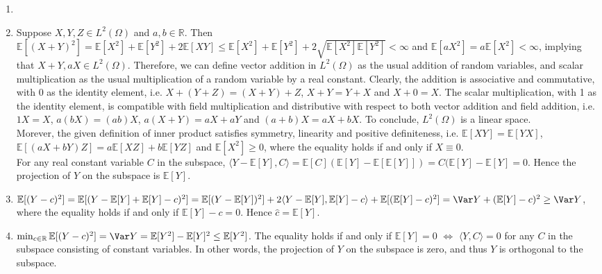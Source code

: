 \begin{exercise}
\begin{enumerate}
			\begin{solution}
				\begin{enumerate}
					\item []
					\item
						Suppose $X,Y,Z\in L^2(\Omega)$ and $a,b\in\mathbb{R}$.
						Then $\mathbb{E}[(X+Y)^2] = \mathbb{E}[X^2] + \mathbb{E}[Y^2] + 2\mathbb{E}[XY] \leq \mathbb{E}[X^2] + \mathbb{E}[Y^2] + 2\sqrt{\mathbb{E}[X^2]\mathbb{E}[Y^2]} < \infty$ and $\mathbb{E}[aX^2] = a\mathbb{E}[X^2] < \infty$, implying that $X+Y, aX\in L^2(\Omega)$.
						Therefore, we can define vector addition in $L^2(\Omega)$ as the usual addition of random variables, and scalar multiplication as the usual multiplication of a random variable by a real constant.
						Clearly, the addition is associative and commutative, with 0 as the identity element, i.e. $X + (Y + Z) = (X + Y) + Z$, $X + Y = Y + X$ and $X + 0 = X$.
						The scalar multiplication, with 1 as the identity element, is compatible with field multiplication and distributive with respect to both vector addition and field addition, i.e. $1X = X$, $a(bX) = (ab)X$, $a(X + Y) = aX + aY$ and $(a + b)X = aX + bX$.
						To conclude, $L^2(\Omega)$ is a linear space. \\
						Morever, the given definition of inner product satisfies symmetry, linearity and positive definiteness, i.e. $\mathbb{E}[XY] = \mathbb{E}[YX]$, $\mathbb{E}[(aX + bY) Z] = a\mathbb{E}[XZ] + b\mathbb{E}[YZ]$ and $\mathbb{E}[X^2] \geq 0$, where the equality holds if and only if $X\equiv 0$. \\
						For any real constant variable $C$ in the subspace, $\langle Y-\mathbb{E}[Y], C \rangle = \mathbb{E}[C](\mathbb{E}[Y]-\mathbb{E}[\mathbb{E}[Y]]) = C(\mathbb{E}[Y]-\mathbb{E}[Y] = 0$.
						Hence the projection of $Y$ on the subspace is $\mathbb{E}[Y]$.
					\item
						$\mathbb{E}[(Y-c)^2] = \mathbb{E}[(Y-\mathbb{E}[Y]+\mathbb{E}[Y]-c)^2] = \mathbb{E}[(Y-\mathbb{E}[Y])^2] + 2\langle Y-\mathbb{E}[Y], \mathbb{E}[Y]-c \rangle + \mathbb{E}[(\mathbb{E}[Y]-c)^2]  = \Var Y + (\mathbb{E}[Y]-c)^2 \geq \Var Y$, where the equality holds if and only if $\mathbb{E}[Y]-c=0$.
						Hence $\hat{c}=\mathbb{E}[Y]$.
					\item
						$\min_{c\in \mathbb{R}}\mathbb{E}[(Y-c)^2] = \Var Y = \mathbb{E}[Y^2] - \mathbb{E}[Y]^2 \leq \mathbb{E}[Y^2]$. The equality holds if and only if $\mathbb{E}[Y]=0$ $\iff$ $\langle Y, C\rangle=0$ for any $C$ in the subspace consisting of constant variables. In other words, the projection of $Y$ on the subspace is zero, and thus $Y$ is orthogonal to the subspace.
						\qedhere


\end{enumerate}
\end{solution}
\end{enumerate}
\end{exercise}
